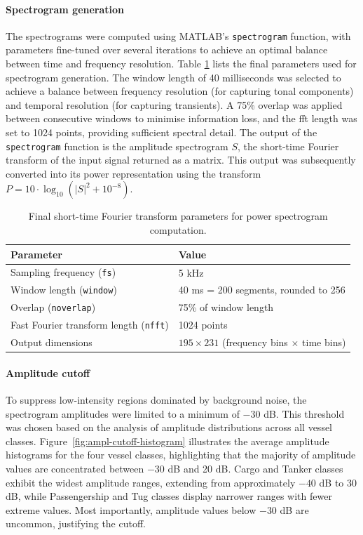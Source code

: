 \paragraph{Spectrogram generation}
The spectrograms were computed using MATLAB's \texttt{spectro\-gram} function, with parameters fine-tuned over several iterations to achieve an optimal balance between time and frequency resolution. Table \ref{tab:powerspectrogram-parameters} lists the final parameters used for spectrogram generation. The window length of 40 milliseconds was selected to achieve a balance between frequency resolution (for capturing tonal components) and temporal resolution (for capturing transients). A 75\% overlap was applied between consecutive windows to minimise information loss, and the \acrshort{fft} length was set to 1024 points, providing sufficient spectral detail. The output of the \texttt{spectrogram} function is the amplitude spectrogram $S$, the short-time Fourier transform of the input signal returned as a matrix. This output was subsequently converted into its power representation using the transform $P = 10 \cdot \log_{10}(|S|^2 + 10^{-8})$.

\begin{table}[htbp]
    \centering
    \caption{Final short-time Fourier transform parameters for power spectrogram computation.}
    \label{tab:powerspectrogram-parameters}
    \begin{tabular}{ll} \toprule 
    \textbf{Parameter} & \textbf{Value} \\ \midrule 
    Sampling frequency (\texttt{fs}) & 5 kHz \\ 
    Window length (\texttt{window}) & 40 ms = 200 segments, rounded to 256 \\ 
    Overlap (\texttt{noverlap}) & 75\% of window length \\ 
    Fast Fourier transform length (\texttt{nfft}) & 1024 points \\ 
    Output dimensions & $195 \times 231$ (frequency bins $\times$ time bins) \\ \bottomrule
    \end{tabular}
\end{table}

\paragraph{Amplitude cutoff}
To suppress low-intensity regions dominated by background noise, the spectrogram amplitudes were limited to a minimum of $-30$ dB. This threshold was chosen based on the analysis of amplitude distributions across all vessel classes. Figure~\ref{fig:ampl-cutoff-histogram} illustrates the average amplitude histograms for the four vessel classes, highlighting that the majority of amplitude values are concentrated between $-30$ dB and 20 dB. Cargo and Tanker classes exhibit the widest amplitude ranges, extending from approximately $-40$ dB to 30 dB, while Passengership and Tug classes display narrower ranges with fewer extreme values. Most importantly, amplitude values below $-30$ dB are uncommon, justifying the cutoff.

